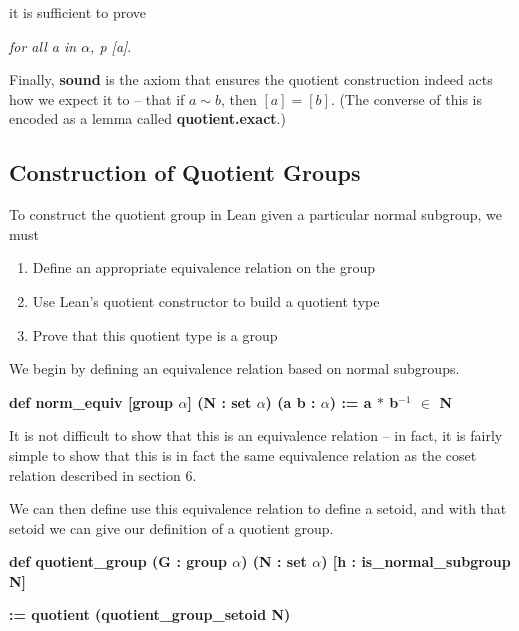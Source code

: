 \documentclass[runningheads,a4paper]{llncs}
\renewcommand{\a}{\alpha}
\renewcommand{\-}{\setminus}
\begin{document}
it is sufficient to prove

\vspace{2 mm}
\hspace{2 em}\textit{for all a in $\a$, p [a]}.
\vspace{2 mm}

Finally, \textbf{sound} is the axiom that ensures the quotient construction indeed acts how we expect it to -- that if $a \sim b$, then $[a] = [b]$. (The converse of this is encoded as a lemma called \textbf{quotient.exact}.)

\subsection{Construction of Quotient Groups}

To construct the quotient group in Lean given a particular normal subgroup, we must
\begin{enumerate}
    \item Define an appropriate equivalence relation on the group
    \item Use Lean's quotient constructor to build a quotient type
    \item Prove that this quotient type is a group
\end{enumerate}

We begin by defining an equivalence relation based on normal subgroups.

\vspace{2 mm}
\hspace{2 em}\textbf{def norm\_equiv [group $\a$] (N : set $\a$) (a b : $\a$) := a $*$ b$^{-1}$ $\in$ N}
\vspace{2 mm}

It is not difficult to show that this is an equivalence relation -- in fact, it is fairly simple to show that this is in fact the same equivalence relation as the coset relation described in section 6.

We can then define use this equivalence relation to define a setoid, and with that setoid we can give our definition of a quotient group.

\vspace{2 mm}
\hspace{2 em}\textbf{def quotient\_group (G : group $\a$) (N : set $\a$) [h : is\_normal\_subgroup N]}

\hspace{4 em}\textbf{:= quotient (quotient\_group\_setoid N)}
\vspace{2 mm}
\end{document}
